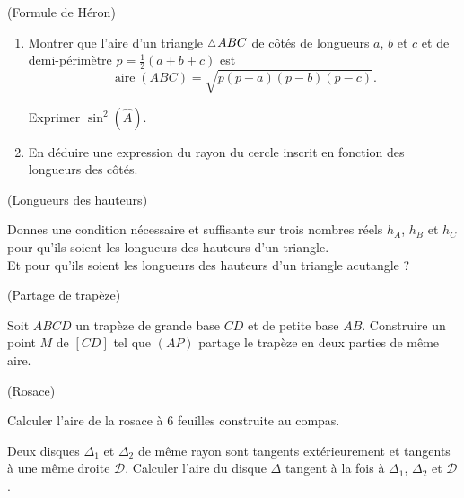 \documentclass[a4paper,11pt,reqno]{amsart}
\DeclareMathOperator{\aire}{aire}
\begin{document}
\begin{exo} (Formule de Héron)

  \begin{enumerate}
    \item Montrer que l'aire d'un triangle $\tri ABC$ de côtés de longueurs $a$, $b$ et $c$ et de demi-périmètre $p=\frac{1}{2}(a+b+c)$ est
    $$
      \aire{(ABC)}=\sqrt{p(p-a)(p-b)(p-c)}.
    $$
    \begin{indication}
      Exprimer $\sin^2(\widehat{A})$.
    \end{indication}
    \item En déduire une expression du rayon du cercle inscrit en fonction des longueurs des côtés.
  \end{enumerate}
\end{exo}

\begin{exo} (Longueurs des hauteurs)

  Donnes une condition nécessaire et suffisante sur trois nombres réels $h_{A}$, $h_{B}$ et $h_{C}$ pour qu'ils soient les longueurs des hauteurs d'un triangle.\\
  Et pour qu'ils soient les longueurs des hauteurs d'un triangle acutangle ?
\end{exo}

\begin{exo}[.7] (Partage de trapèze)

  Soit $ABCD$ un trapèze de grande base $CD$ et de petite base $AB$. Construire un point $M$ de $[CD]$ tel que $(AP)$ partage le trapèze en deux parties de même aire.
\end{exo}

\begin{exo}[.5] (Rosace)

  Calculer l'aire de la rosace à 6 feuilles construite au compas.
\end{exo}

\begin{exo}[.7]

  Deux disques $\Delta_1$ et $\Delta_2$ de même rayon sont tangents extérieurement et tangents à une même droite $\mathcal D$. Calculer l'aire du disque $\Delta$ tangent à la fois à $\Delta_1$, $\Delta_2$ et $\mathcal D$.
\end{exo}
\end{document}
